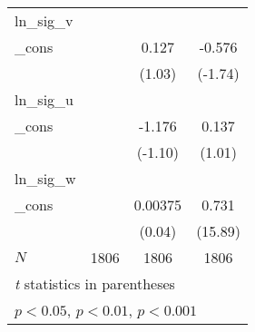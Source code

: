 \begin{table}[htbp]
\begin{tabular}{l*{3}{c}}
\hline
ln\_sig\_v    &                     &                     &                     \\
\_cons      &                     &       0.127         &      -0.576         \\
            &                     &      (1.03)         &     (-1.74)         \\
\hline
ln\_sig\_u    &                     &                     &                     \\
\_cons      &                     &      -1.176         &       0.137         \\
            &                     &     (-1.10)         &      (1.01)         \\
\hline
ln\_sig\_w    &                     &                     &                     \\
\_cons      &                     &     0.00375         &       0.731\sym{***}\\
            &                     &      (0.04)         &     (15.89)         \\
\hline
\(N\)       &        1806         &        1806         &        1806         \\
\hline\hline
\multicolumn{4}{l}{\footnotesize \textit{t} statistics in parentheses}\\
\multicolumn{4}{l}{\footnotesize \sym{*} \(p<0.05\), \sym{**} \(p<0.01\), \sym{***} \(p<0.001\)}\\
\end{tabular}
\end{table}
